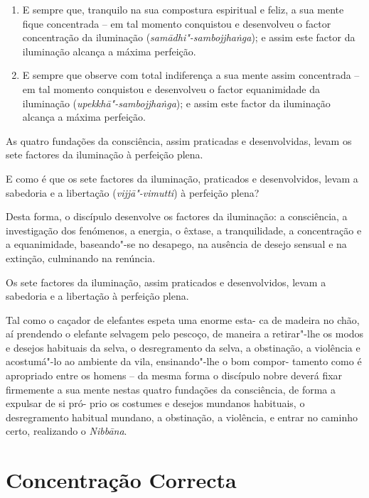 \begin{enumerate}
  \item E sempre que, tranquilo na sua compostura espiritual e feliz, a sua
        mente fique concentrada -- em tal momento conquistou e desenvolveu o
        factor concentração da iluminação (\emph{samādhi"-sambojjhaṅga}); e assim
        este factor da iluminação alcança a máxima perfeição.

  \item E sempre que observe com total indiferença a sua mente assim concentrada
        -- em tal momento conquistou e desenvolveu o factor equanimidade da
        iluminação (\emph{upekkhā"-sambojjhaṅga}); e assim este factor da
        iluminação alcança a máxima perfeição.

\end{enumerate}

As quatro fundações da consciência, assim praticadas e desenvolvidas, levam os
sete factores da iluminação à perfeição plena.

E como é que os sete factores da iluminação, praticados e desenvolvidos, levam a
sabedoria e a libertação (\emph{vijjā"-vimutti}) à perfeição plena?

Desta forma, o discípulo desenvolve os factores da iluminação: a consciência, a
investigação dos fenómenos, a energia, o êxtase, a tranquilidade, a concentração
e a equanimidade, baseando"-se no desapego, na ausência de desejo sensual e na
extinção, culminando na renúncia.

Os sete factores da iluminação, assim praticados e desenvolvidos, levam a
sabedoria e a libertação à perfeição plena.


Tal como o caçador de elefantes espeta uma enorme esta- ca de madeira no chão,
aí prendendo o elefante selvagem pelo pescoço, de maneira a retirar"-lhe os modos
e desejos habituais da selva, o desregramento da selva, a obstinação, a
violência e acostumá"-lo ao ambiente da vila, ensinando"-lhe o bom compor- tamento
como é apropriado entre os homens -- da mesma forma o discípulo nobre deverá
fixar firmemente a sua mente nestas quatro fundações da consciência, de forma a
expulsar de si pró- prio os costumes e desejos mundanos habituais, o
desregramento habitual mundano, a obstinação, a violência, e entrar no caminho
certo, realizando o \emph{Nibbāna}.


\section{Concentração Correcta}

